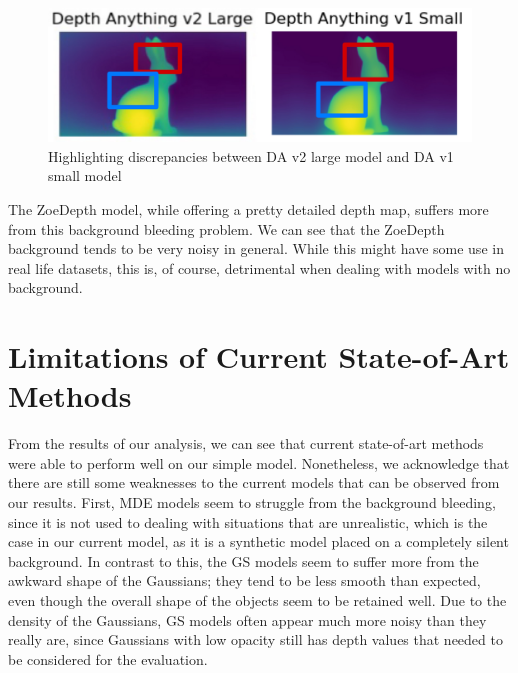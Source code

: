 \begin{figure}[h]
    \centering
    \includegraphics[width=1\linewidth]{figures/bunny-comparison.png}
    \caption{Highlighting discrepancies between DA v2 large model and DA v1 small model}
    \label{fig:bunny-comparison}
\end{figure}

The ZoeDepth model, while offering a pretty detailed depth map, suffers more from this background bleeding problem. We can see that the ZoeDepth background tends to be very noisy in general. While this might have some use in real life datasets, this is, of course, detrimental when dealing with models with no background.

\section{Limitations of Current State-of-Art Methods}

From the results of our analysis, we can see that current state-of-art methods were able to perform well on our simple model. Nonetheless, we acknowledge that there are still some weaknesses to the current models that can be observed from our results. First, MDE models seem to struggle from the background bleeding, since it is not used to dealing with situations that are unrealistic, which is the case in our current model, as it is a synthetic model placed on a completely silent background. In contrast to this, the GS models seem to suffer more from the awkward shape of the Gaussians; they tend to be less smooth than expected, even though the overall shape of the objects seem to be retained well. Due to the density of the Gaussians, GS models often appear much more noisy than they really are, since Gaussians with low opacity still has depth values that needed to be considered for the evaluation.